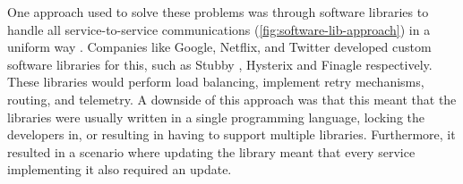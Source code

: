 One approach used to solve these problems was through software libraries to handle all service-to-service communications (\cref{fig:software-lib-approach}) in a uniform way \cite{service-mesh-history}. Companies like Google, Netflix, and Twitter developed custom software libraries for this, such as Stubby \cite{stubby}, Hysterix \cite{hysterix} and Finagle \cite{finagle} respectively. These libraries would perform load balancing, implement retry mechanisms, routing, and telemetry. A downside of this approach was that this meant that the libraries were usually written in a single programming language, locking the developers in, or resulting in having to support multiple libraries. Furthermore, it resulted in a scenario where updating the library meant that every service implementing it also required an update. 



